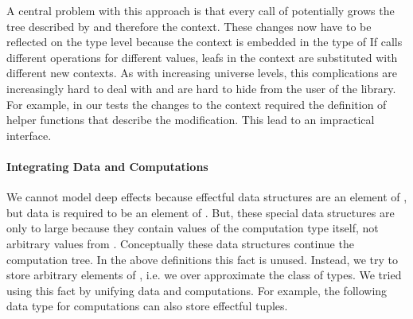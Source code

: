 % 

A central problem with this approach is that every call of \AgdaFunction{>>=}
potentially grows the tree described by  and therefore the
context.
These changes now have to be reflected on the type level because the context is
embedded in the type of 
If \AgdaFunction{>>=} calls different operations for different values, leafs in
the context are substituted with different new contexts.
As with increasing universe levels, this complications are increasingly hard to
deal with and are hard to hide from the user of the library.
For example, in our tests the changes to the context required the definition of
helper functions that describe the modification.
This lead to an impractical interface.

\paragraph{Integrating Data and Computations}
We cannot model deep effects because effectful data structures are an element
of , but data is required to be an element of
.
But, these special data structures are only to large because they contain
values of the computation type  itself, not arbitrary values
from .
Conceptually these data structures continue the computation tree.
In the above definitions this fact is unused.
Instead, we try to store arbitrary elements of , i.e. we over
approximate the class of types.
We tried using this fact by unifying data and computations.
For example, the following data type for computations can also store effectful
tuples.

